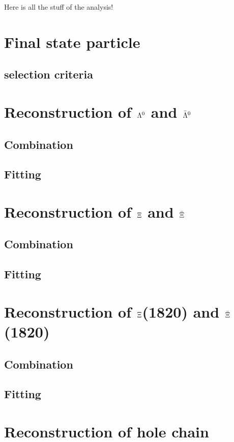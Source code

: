 Here is all the stuff of the analysis!

\section{Final state particle}
	\subsection{selection criteria}

\section{Reconstruction of $\boldmath{\Lambda}^0$ and $\boldmath{\bar{\Lambda}^0}$}
	\subsection{Combination}
	\subsection{Fitting}
	
\section{Reconstruction of $\boldmath{\Xi}$ and $\boldmath{\bar{\Xi}}$}
	\subsection{Combination}
	\subsection{Fitting}

\section{Reconstruction of $\boldmath{\Xi}$(1820) and $\boldmath{\bar{\Xi}}$(1820)}
	\subsection{Combination}
	\subsection{Fitting}
	
\section{Reconstruction of hole chain}